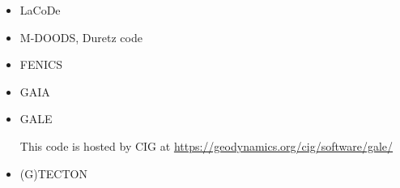 \begin{itemize}
\item {\codefont LaCoDe}  

{\small
\cite{demh19}
}

\item {\codefont M-DOODS}, Duretz code

{\small
\cite{yatd12}
\cite{yahb13}
\cite{yadm15}
\cite{chmd19}\cite{dual19}\cite{pedm19}
}

\item {\codefont FENICS} 

\cite{alrk14}

\item {\codefont GAIA} 

{\small
\noindent
\cite{toyu11}
\cite{hutm13}
\cite{neum19}
}

\item {\codefont GALE} 

This code is hosted by CIG at \url{https://geodynamics.org/cig/software/gale/}

{\small
\noindent
\cite{fabs08}
\cite{gotc08}
\cite{beve10}
\cite{cmwt10}
\cite{lehm12}\cite{liqi12}
\cite{arbi13}
}

\item {\codefont (G)TECTON}  


\end{itemize}
